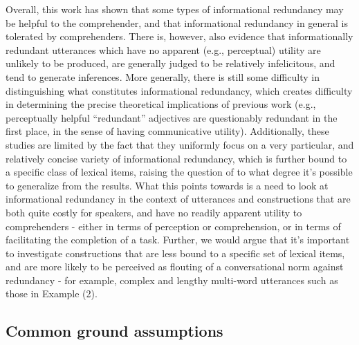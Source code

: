 Overall, this work has shown that some types of informational redundancy
may be helpful to the comprehender, and that informational redundancy in
general is tolerated by comprehenders. There is, however, also evidence
that informationally redundant utterances which have no apparent (e.g.,
perceptual) utility are unlikely to be produced, are generally judged to
be relatively infelicitous, and tend to generate inferences. More
generally, there is still some difficulty in distinguishing what
constitutes informational redundancy, which creates difficulty in
determining the precise theoretical implications of previous work (e.g.,
perceptually helpful \enquote{redundant} adjectives are questionably
redundant in the first place, in the sense of having communicative
utility). Additionally, these studies are limited by the fact that they
uniformly focus on a very particular, and relatively concise variety of
informational redundancy, which is further bound to a specific class of
lexical items, raising the question of to what degree it's possible to
generalize from the results. What this points towards is a need to look
at informational redundancy in the context of utterances and
constructions that are both quite costly for speakers, and have no
readily apparent utility to comprehenders - either in terms of
perception or comprehension, or in terms of facilitating the completion
of a task. Further, we would argue that it's important to investigate
constructions that are less bound to a specific set of lexical items,
and are more likely to be perceived as flouting of a conversational norm
against redundancy - for example, complex and lengthy multi-word
utterances such as those in Example (2).

\subsection{Common ground assumptions}\label{common-ground-assumptions}


